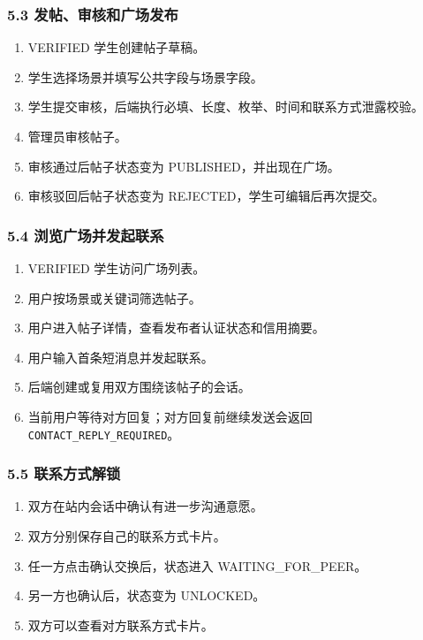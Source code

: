 \documentclass[
]{ctexart}
\providecommand{\tightlist}{%
  \setlength{\itemsep}{0pt}\setlength{\parskip}{0pt}}
\begin{document}
\hypertarget{ux53d1ux5e16ux5ba1ux6838ux548cux5e7fux573aux53d1ux5e03}{%
\subsubsection{5.3
发帖、审核和广场发布}\label{ux53d1ux5e16ux5ba1ux6838ux548cux5e7fux573aux53d1ux5e03}}

\begin{enumerate}
\def\labelenumi{\arabic{enumi}.}
\tightlist
\item
  VERIFIED 学生创建帖子草稿。
\item
  学生选择场景并填写公共字段与场景字段。
\item
  学生提交审核，后端执行必填、长度、枚举、时间和联系方式泄露校验。
\item
  管理员审核帖子。
\item
  审核通过后帖子状态变为 PUBLISHED，并出现在广场。
\item
  审核驳回后帖子状态变为 REJECTED，学生可编辑后再次提交。
\end{enumerate}

\hypertarget{ux6d4fux89c8ux5e7fux573aux5e76ux53d1ux8d77ux8054ux7cfb}{%
\subsubsection{5.4
浏览广场并发起联系}\label{ux6d4fux89c8ux5e7fux573aux5e76ux53d1ux8d77ux8054ux7cfb}}

\begin{enumerate}
\def\labelenumi{\arabic{enumi}.}
\tightlist
\item
  VERIFIED 学生访问广场列表。
\item
  用户按场景或关键词筛选帖子。
\item
  用户进入帖子详情，查看发布者认证状态和信用摘要。
\item
  用户输入首条短消息并发起联系。
\item
  后端创建或复用双方围绕该帖子的会话。
\item
  当前用户等待对方回复；对方回复前继续发送会返回
  \texttt{CONTACT\_REPLY\_REQUIRED}。
\end{enumerate}

\hypertarget{ux8054ux7cfbux65b9ux5f0fux89e3ux9501}{%
\subsubsection{5.5
联系方式解锁}\label{ux8054ux7cfbux65b9ux5f0fux89e3ux9501}}

\begin{enumerate}
\def\labelenumi{\arabic{enumi}.}
\tightlist
\item
  双方在站内会话中确认有进一步沟通意愿。
\item
  双方分别保存自己的联系方式卡片。
\item
  任一方点击确认交换后，状态进入 WAITING\_FOR\_PEER。
\item
  另一方也确认后，状态变为 UNLOCKED。
\item
  双方可以查看对方联系方式卡片。
\end{enumerate}
\end{document}
